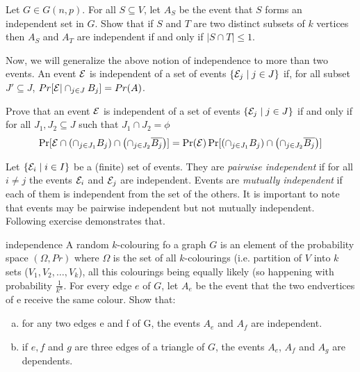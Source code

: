 \begin{exercise}
Let $G \in G(n,p)$. For all $S \subseteq V$, let $A_S$ be the event that $S$ forms an independent set in $G$. Show that if $S$ and $T$ are two distinct subsets of $k$ vertices then $A_S$ and $A_T$ are independent if and only if
$|S \cap T| \le 1$.
\end{exercise}

\noindent Now, we will generalize the above notion of independence to more than two events. An event ${\cal E}$ is independent of a set of events
$\{ {\cal E}_j \mid j \in J\}$ if, for all subset $J' \subseteq J$, 
$Pr [ {\cal E} | \cap_{j \in J} B_j ] = Pr(A)$.

\begin{exercise}
Prove that an event ${\cal E}$ is independent of a set of events $\{ {\cal E}_j \mid j \in J\}$ 
if and only if for all $J_1, J_2 \subseteq J$
such that $J_1 \cap J_2 = \phi$
$$\Pr [ {\cal E} \cap \left( \cap_{j \in J_1} B_j \right) \cap \left( \cap_{j \in J_2} \overline{B_j} \right) ] = \Pr({\cal E}) \Pr[\left( \cap_{j \in J_1} B_j \right) \cap \left( \cap_{j \in J_2} \overline{B_j} \right) ]$$
\end{exercise}

Let $\{ {\cal E}_i \mid i \in I \}$ be a (finite) set of events. They are \textit{pairwise independent} if for all $i \ne j$ the events ${\cal E}_i$ and ${\cal E}_j$ are independent. Events are \textit{mutually independent} if each of them is independent from the set of the others. It is important to note that events may be pairwise independent but not mutually independent. Following exercise demonstrates that.

\begin{exercise-prob}
\begin{show-ps1}{independence}
A random $k$-colouring fo a graph $G$ is an element of the probability space $(\Omega,Pr)$
where $\Omega$ is the set of all $k$-colourings (i.e. partition of $V$ into $k$ sets ($V_1,V_2,\ldots,V_k$), all this colourings being equally likely (so happening with probability $\frac{1}{k^n}$. For every edge $e$ of $G$, let $A_e$ be the event that the two endvertices of e receive the same colour. Show that:
\begin{enumerate}[(a)]
\item for any two edges e and f of G, the events $A_e$ and $A_f$ are independent.
\item if $e,f$ and $g$ are three edges of a triangle of $G$, the events $A_e$, $A_f$ and $A_g$ are dependents.
\end{enumerate}
\end{show-ps1}
\end{exercise-prob}

